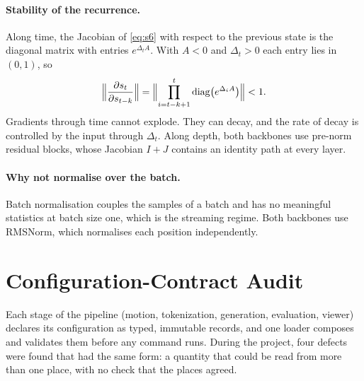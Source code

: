 \paragraph{Stability of the recurrence.} Along time, the Jacobian of \eqref{eq:s6} with respect to the previous state is the diagonal matrix with entries $e^{\Delta_t A}$. With $A < 0$ and $\Delta_t > 0$ each entry lies in $(0,1)$, so
\begin{equation}
\Bigl\lVert \frac{\partial s_t}{\partial s_{t-k}} \Bigr\rVert = \Bigl\lVert \prod_{i=t-k+1}^{t} \operatorname{diag}\bigl(e^{\Delta_i A}\bigr) \Bigr\rVert < 1 .
\end{equation}
Gradients through time cannot explode. They can decay, and the rate of decay is controlled by the input through $\Delta_t$. Along depth, both backbones use pre-norm residual blocks, whose Jacobian $I + J$ contains an identity path at every layer.

\paragraph{Why not normalise over the batch.} Batch normalisation couples the samples of a batch and has no meaningful statistics at batch size one, which is the streaming regime. Both backbones use RMSNorm, which normalises each position independently.

\section{Configuration-Contract Audit}
\label{sec:app_contracts}

Each stage of the pipeline (motion, tokenization, generation, evaluation, viewer) declares its configuration as typed, immutable records, and one loader composes and validates them before any command runs. During the project, four defects were found that had the same form: a quantity that could be read from more than one place, with no check that the places agreed.


